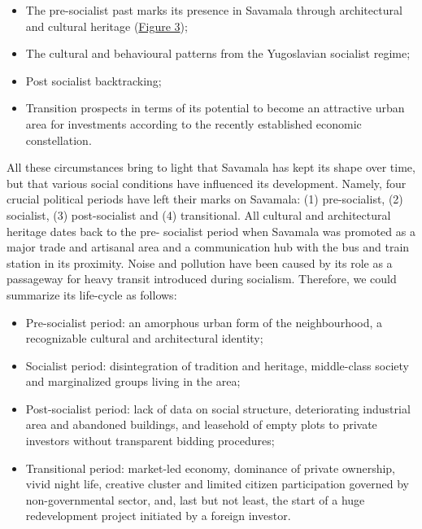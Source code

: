 \documentclass[11pt]{report}
\begin{document}
{{{{\begin{itemize}
\item The pre-socialist past marks its presence in Savamala through architectural and cultural heritage (\href{Figure 3}{Figure 3});
\item The cultural and behavioural patterns from the Yugoslavian socialist regime;
\item Post socialist backtracking;
\item Transition prospects in terms of its potential to become an attractive urban area for investments according to the recently established economic constellation.
\end{itemize}

All these circumstances bring to light that Savamala has kept its shape over time, but that various social conditions have influenced its development. Namely, four crucial political periods have left their marks on Savamala: (1) pre-socialist, (2) socialist, (3) post-socialist and (4) transitional. All cultural and architectural heritage dates back to the pre- socialist period when Savamala was promoted as a major trade and artisanal area and a communication hub with the bus and train station in its proximity. Noise and pollution have been caused by its role as a passageway for heavy transit introduced during socialism. Therefore, we could summarize its life-cycle as follows:

\begin{itemize}
\item Pre-socialist period: an amorphous urban form of the neighbourhood, a recognizable cultural  and  architectural  identity;

\item Socialist period: disintegration of tradition and heritage, middle-class society and marginalized groups living in the area;

\item Post-socialist period: lack of data on social structure, deteriorating industrial area and abandoned buildings, and leasehold of empty plots to private investors without transparent bidding procedures;

\item Transitional period: market-led economy, dominance of private ownership, vivid night life, creative cluster and limited citizen participation governed by non-governmental sector, and, last but not least, the start of a huge redevelopment project initiated by a foreign investor.
\end{itemize}

}}}}
\end{document}

